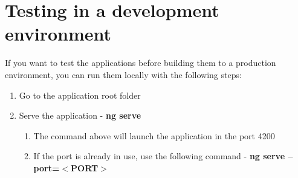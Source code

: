 \section{Testing in a development environment}

If you want to test the applications before building them to a production environment, you can run them locally with the following steps:

\begin{enumerate}
    \item Go to the application root folder
    \item Serve the application - \textbf{ng serve}
    \begin{enumerate}
        \item The command above will launch the application in the port 4200
        \item If the port is already in use, use the following command - \textbf{ng serve --port=$<$PORT$>$}
    \end{enumerate}
\end{enumerate}